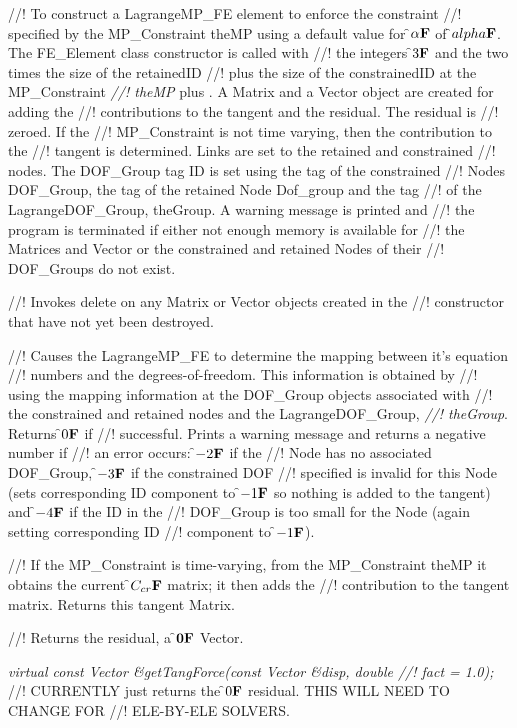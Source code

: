 //! To construct a LagrangeMP\_FE element to enforce the constraint
//! specified by the MP\_Constraint \p theMP using a default value for
\f$\alpha{\bf F}$ of \f$alpha{\bf F}$. The FE\_Element class constructor is called with
//! the integers \f$3{\bf F}$ and the two times the size of the \p retainedID
//! plus the size of the \p constrainedID at the MP\_Constraint {\em
//! theMP} plus . A Matrix and a Vector object are created for adding the
//! contributions to the tangent and the residual. The residual is
//! zeroed. If the
//! MP\_Constraint is not time varying, then the contribution to the
//! tangent is determined. Links are set to the retained and constrained
//! nodes. The DOF\_Group tag ID is set using the tag of the constrained
//! Nodes DOF\_Group, the tag of the retained Node Dof\_group and the tag
//! of the LagrangeDOF\_Group, \p theGroup. A warning message is printed and 
//! the program is terminated if either not enough memory is available for
//! the Matrices and Vector or the constrained and retained Nodes of their
//! DOF\_Groups do not exist.



//! Invokes delete on any Matrix or Vector objects created in the
//! constructor that have not yet been destroyed.

//! Causes the LagrangeMP\_FE to determine the mapping between it's equation
//! numbers and the degrees-of-freedom. This information is obtained by
//! using the mapping information at the DOF\_Group objects associated with
//! the constrained and retained nodes and the LagrangeDOF\_Group, {\em
//! theGroup}. Returns \f$0{\bf F}$ if
//! successful. Prints a warning message and returns a negative number if
//! an error occurs: \f$-2{\bf F}$ if the
//! Node has no associated DOF\_Group, \f$-3{\bf F}$ if the constrained DOF
//! specified is invalid for this Node (sets corresponding ID component to
\f$-1{\bf F}$ so nothing is added to the tangent) and \f$-4{\bf F}$ if the ID in the
//! DOF\_Group is too small for the Node (again setting corresponding ID
//! component to \f$-1{\bf F}$). 

//! If the MP\_Constraint is time-varying, from the MP\_Constraint
\p theMP it obtains the current \f$C_{cr}{\bf F}$ matrix; it then adds the
//! contribution to the tangent matrix. Returns this tangent Matrix.

//! Returns the residual, a \f${\bf 0}{\bf F}$ Vector.

{\em virtual const Vector \&getTangForce(const Vector \&disp, double
//! fact = 1.0);    }
//! CURRENTLY just returns the \f$0{\bf F}$ residual. THIS WILL NEED TO CHANGE FOR
//! ELE-BY-ELE SOLVERS. 

